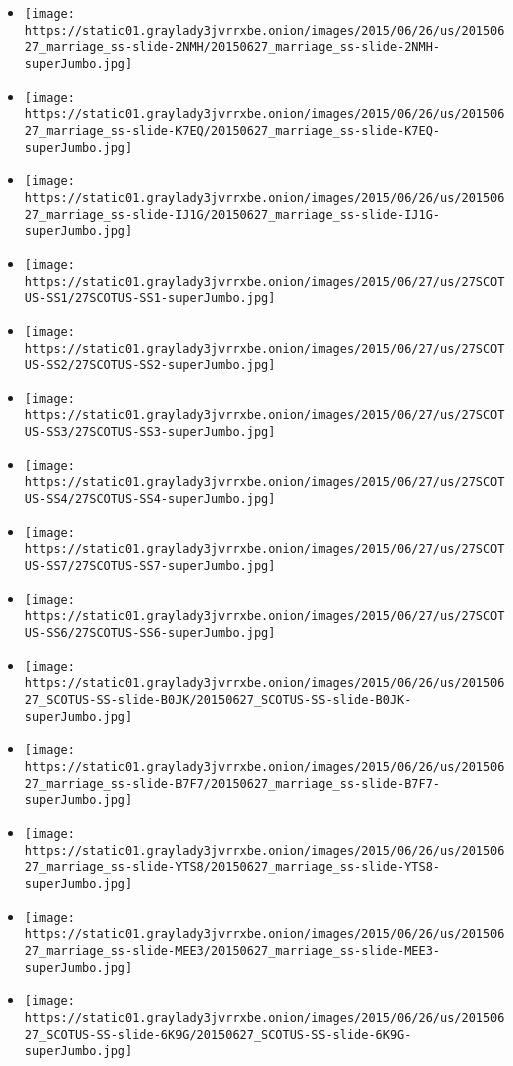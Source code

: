 \begin{itemize}
\item
  \texttt{[image: https://static01.graylady3jvrrxbe.onion/images/2015/06/26/us/20150627\_marriage\_ss-slide-2NMH/20150627\_marriage\_ss-slide-2NMH-superJumbo.jpg]}
\item
  \texttt{[image: https://static01.graylady3jvrrxbe.onion/images/2015/06/26/us/20150627\_marriage\_ss-slide-K7EQ/20150627\_marriage\_ss-slide-K7EQ-superJumbo.jpg]}
\item
  \texttt{[image: https://static01.graylady3jvrrxbe.onion/images/2015/06/26/us/20150627\_marriage\_ss-slide-IJ1G/20150627\_marriage\_ss-slide-IJ1G-superJumbo.jpg]}
\item
  \texttt{[image: https://static01.graylady3jvrrxbe.onion/images/2015/06/27/us/27SCOTUS-SS1/27SCOTUS-SS1-superJumbo.jpg]}
\item
  \texttt{[image: https://static01.graylady3jvrrxbe.onion/images/2015/06/27/us/27SCOTUS-SS2/27SCOTUS-SS2-superJumbo.jpg]}
\item
  \texttt{[image: https://static01.graylady3jvrrxbe.onion/images/2015/06/27/us/27SCOTUS-SS3/27SCOTUS-SS3-superJumbo.jpg]}
\item
  \texttt{[image: https://static01.graylady3jvrrxbe.onion/images/2015/06/27/us/27SCOTUS-SS4/27SCOTUS-SS4-superJumbo.jpg]}
\item
  \texttt{[image: https://static01.graylady3jvrrxbe.onion/images/2015/06/27/us/27SCOTUS-SS7/27SCOTUS-SS7-superJumbo.jpg]}
\item
  \texttt{[image: https://static01.graylady3jvrrxbe.onion/images/2015/06/27/us/27SCOTUS-SS6/27SCOTUS-SS6-superJumbo.jpg]}
\item
  \texttt{[image: https://static01.graylady3jvrrxbe.onion/images/2015/06/26/us/20150627\_SCOTUS-SS-slide-B0JK/20150627\_SCOTUS-SS-slide-B0JK-superJumbo.jpg]}
\item
  \texttt{[image: https://static01.graylady3jvrrxbe.onion/images/2015/06/26/us/20150627\_marriage\_ss-slide-B7F7/20150627\_marriage\_ss-slide-B7F7-superJumbo.jpg]}
\item
  \texttt{[image: https://static01.graylady3jvrrxbe.onion/images/2015/06/26/us/20150627\_marriage\_ss-slide-YTS8/20150627\_marriage\_ss-slide-YTS8-superJumbo.jpg]}
\item
  \texttt{[image: https://static01.graylady3jvrrxbe.onion/images/2015/06/26/us/20150627\_marriage\_ss-slide-MEE3/20150627\_marriage\_ss-slide-MEE3-superJumbo.jpg]}
\item
  \texttt{[image: https://static01.graylady3jvrrxbe.onion/images/2015/06/26/us/20150627\_SCOTUS-SS-slide-6K9G/20150627\_SCOTUS-SS-slide-6K9G-superJumbo.jpg]}
\end{itemize}

